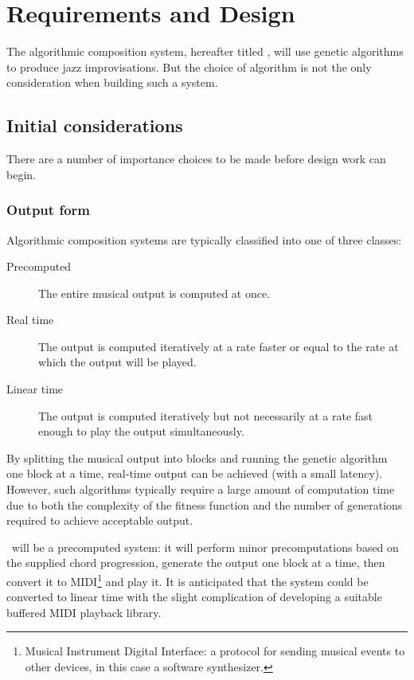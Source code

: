 \chapter{Requirements and Design}
\label{chap-design}


The algorithmic composition system, hereafter titled \jg, will use genetic algorithms
to produce jazz improvisations. But the choice of algorithm is not the only consideration
when building such a system.

\section{Initial considerations}

There are a number of importance choices to be made before design work can begin.

\subsection{Output form}

Algorithmic composition systems are typically classified into one of three classes:

\begin{description}
\item[Precomputed] The entire musical output is computed at once.
\item[Real time] The output is computed iteratively at a rate faster or equal to the rate
 at which the output will be played.
\item[Linear time] The output is computed iteratively but not necessarily at a rate
fast enough to play the output simultaneously.
\end{description}

By splitting the musical output into blocks and running the genetic algorithm one block
at a time, real-time output can be achieved (with a small latency). However, such algorithms
typically require a large amount of computation time due to both the complexity of the
fitness function and the number of generations required to achieve acceptable output.

\jg\ will be a precomputed system: it will perform minor precomputations based on the supplied
chord progression, generate the output one block at a time, then convert it to MIDI\footnote{Musical Instrument Digital Interface: a protocol for sending musical events to other devices, in this case a software synthesizer.}
and play it. It is anticipated that the system could be converted to linear time with
the slight complication of developing a suitable buffered MIDI playback library.

